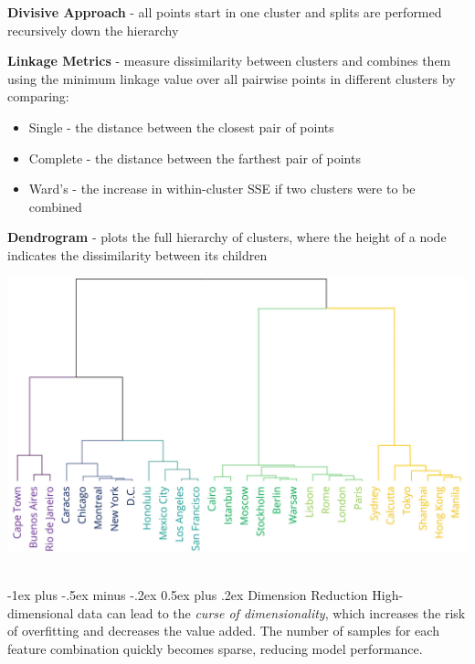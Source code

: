 \documentclass[10pt,landscape]{article}
\makeatletter
\renewcommand{\section}{\@startsection{section}{1}{0mm}%
                                {-1ex plus -.5ex minus -.2ex}%
                                {0.5ex plus .2ex}%
                                {\normalfont\large\bfseries}}
\makeatother
\begin{document}
\begin{multicols}{3}
    \textbf{Divisive Approach} - all points start in one cluster and splits are performed recursively down the hierarchy

    \textbf{Linkage Metrics} - measure dissimilarity between clusters and combines them using the minimum linkage value over all pairwise points in different clusters by comparing:
    \begin{itemize}[label={--},leftmargin=4mm]
        \itemsep -.4mm
        \item Single - the distance between the closest pair of points
        \item Complete - the distance between the farthest pair of points
        \item Ward's - the increase in within-cluster SSE if two clusters were to be combined
    \end{itemize}
    \textbf{Dendrogram} - plots the full hierarchy of clusters, where the height of a node indicates the dissimilarity between its children
    \begin{center}
        \includegraphics[scale = .1]{images/dendroedit3.JPG}
    \end{center}

    \textcolor{white}{.}\vspace{-5mm}\\ %
    \section{Dimension Reduction}
    High-dimensional data can lead to the \emph{curse of dimensionality}, which increases the risk of overfitting and decreases the value added. The number of samples for each feature combination quickly becomes sparse, reducing model performance.


\end{multicols}
\end{document}
